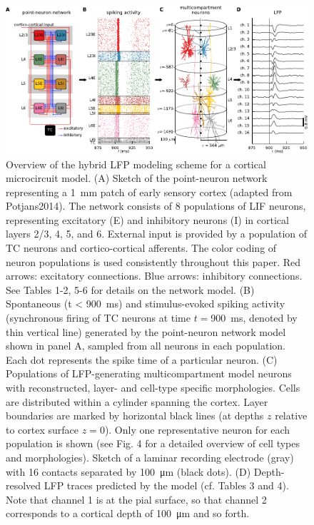\begin{figure}[htbp]
\begin{center}
\includegraphics[width=\columnwidth]{Figures/Ch-LFPy/hybridmodel}
\caption{
Overview of the hybrid LFP modeling scheme for a cortical microcircuit model.
(A) Sketch of the point-neuron network representing a
\SI{1}{\milli\metre} patch of early sensory cortex (adapted from Potjans2014).
The network consists of 8 populations of LIF neurons, representing excitatory (E) and inhibitory neurons (I) in cortical layers 2/3, 4, 5, and 6.
External input is provided by a population of TC neurons and cortico-cortical afferents.
The color coding of neuron populations is used consistently throughout this paper.
Red arrows: excitatory connections. Blue arrows: inhibitory connections.
See Tables 1-2, 5-6 for details on the network model.
(B) Spontaneous (t < \SI{900}{\milli\second}) and stimulus-evoked spiking activity (synchronous firing of TC neurons at time $t = $\SI{900}{\milli\second}, denoted by thin vertical line) generated by the point-neuron network model shown in panel A, sampled from all neurons in each population. Each dot represents the spike time of a particular neuron.
(C) Populations of LFP-generating multicompartment model neurons with reconstructed, layer- and cell-type specific morphologies.
Cells are distributed within a cylinder spanning the cortex. Layer boundaries are marked by horizontal black lines (at depths $z$ relative to cortex surface $z = 0$). Only one representative neuron for each population is shown
(see Fig. 4 for a detailed overview of cell types and morphologies).
Sketch of a laminar recording electrode (gray) with 16 contacts separated by \SI{100}{\micro\metre} (black dots).
(D) Depth-resolved LFP traces predicted by the model (cf. Tables 3 and 4).
Note that channel 1 is at the pial surface, so that channel 2 corresponds to a cortical depth of \SI{100}{\micro\metre} and so forth.
}
\label{fig:LFPy:hybridmodel}
\end{center}
\end{figure}



